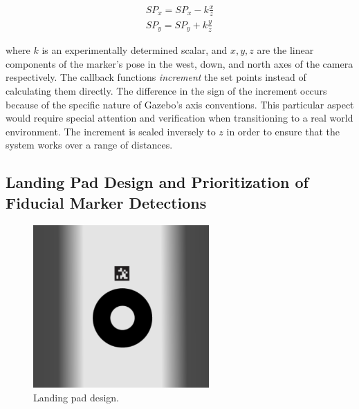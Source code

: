 \begin{equation}
    \begin{array}{l}
        SP_x = SP_x - k \frac{x}{z} \\
        SP_y = SP_y + k \frac{y}{z}
    \end{array}
    \label{equation:setpoints}
\end{equation}

where $k$ is an experimentally determined scalar, and $x,y,z$ are the linear components of the marker's pose in the west, down, and north axes of the camera respectively. The callback functions \textit{increment} the set points instead of calculating them directly. The difference in the sign of the increment occurs because of the specific nature of Gazebo's axis conventions. This particular aspect would require special attention and verification when transitioning to a real world environment. The increment is scaled inversely to $z$ in order to ensure that the system works over a range of distances. 

\subsection{Landing Pad Design and Prioritization of Fiducial Marker Detections}
\label{subsection:landing_pad_design}

\begin{figure}[ht]
    \centering
    \includegraphics[width=0.6\textwidth]{images/landing_pad.png}
    \caption{Landing pad design.}
    \label{fig:landing_pad}
\end{figure}

